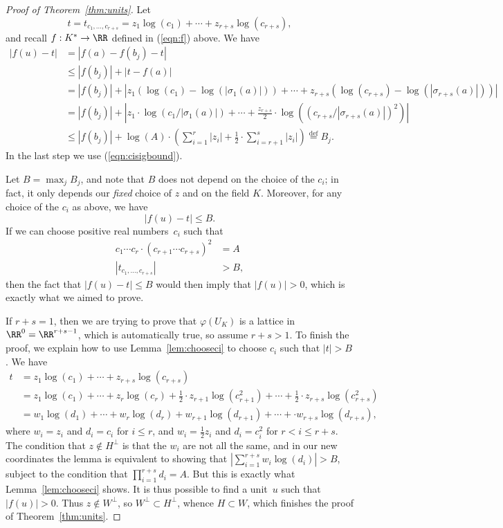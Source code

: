 \begin{proof}[Proof of Theorem~\ref{thm:units}]
  Let
  \[
    t = t_{c_1,\dots, c_{r+s}} = z_1\log(c_1)+\cdots +z_{r+s}\log(c_{r+s}),
  \]
  and recall $f:K^* \to \RR$ defined in (\ref{eqn:f}) above. We have
  \begin{align*}
    |f(u) - t| &= |f(a) - f(b_j) - t| \\
    &\leq |f(b_j)| + |t - f(a)| \\
    &=|f(b_j)| + \left|z_1(\log(c_1) - \log(|\sigma_1(a)|)) + \cdots + z_{r+s}(\log(c_{r+s}) - \log(|\sigma_{r+s}(a)|))\right|
    \\
    &=|f(b_j)| + \left|z_1\cdot \log(c_1/|\sigma_1(a)|) + \cdots + \frac{z_{r+s}}{2}\cdot \log((c_{r+s}/|\sigma_{r+s}(a)|)^2)\right|
    \\
    &\leq |f(b_j)| + \log(A)\cdot\left(\sum_{i=1}^{r}|z_i| + \frac{1}{2}\cdot \sum_{i=r+1}^s|z_i|\right)
    \overset{\text{def}}{=} B_j.
  \end{align*}
  In the last step we use (\ref{eqn:cisigbound}).
  
  Let $B=\max_{j} B_j$, and note that $B$ does not depend on the choice
  of the $c_i$; in fact, it only depends our {\em fixed} choice of $z$ and
  on the field $K$. Moreover, for any choice of the $c_i$ as above, we have
  \[
    |f(u) - t| \leq B.
  \]
  If we can choose positive real numbers~$c_i$ such that
  \begin{align*}
    c_1\cdots c_r\cdot (c_{r+1}\cdots c_{r+s})^2 &= A
    \\
    |t_{c_1,\dots, c_{r+s}}| &>B,
  \end{align*}
  then the fact that $|f(u)-t|\leq B$ would then imply that $|f(u)|>0$,
  which is exactly what we aimed to prove.
  
  If $r+s=1$, then we are trying to prove that $\varphi(U_K)$ is a lattice
  in $\RR^0 = \RR^{r+s-1}$, which is automatically true, so assume $r+s > 1$.
  To finish the proof, we explain how to use Lemma~\ref{lem:chooseci}
  to choose $c_i$ such that $|t|>B$. We have
  \begin{align*}
    t
    &= z_1\log(c_1)+\cdots + z_{r+s}\log(c_{r+s}) \\
    &= z_1\log(c_1)+\cdots + z_r\log(c_r)
    + \frac{1}{2}\cdot z_{r+1}\log(c_{r+1}^2) + \cdots
    + \frac{1}{2}\cdot z_{r+s}\log(c_{r+s}^2) \\
    &= w_1\log(d_1)+\cdots + w_r\log(d_r)+ w_{r+1}\log(d_{r+1}) +
    \cdots +\cdot w_{r+s}\log(d_{r+s}),
  \end{align*}
  where $w_i=z_i$ and $d_i=c_i$ for $i\leq r$, and
  $w_i=\frac{1}{2}z_i$ and $d_i=c_i^2$ for $r<i\leq r+s$.
  The condition that $z\not\in H^{\perp}$ is that the $w_i$ are not all
  the same, and in our new coordinates the lemma is equivalent to
  showing that $|\sum_{i=1}^{r+s} w_i \log(d_i)|>B$, subject to the
  condition that $\prod_{i=1}^{r+s} d_i = A$.
  But this is exactly what Lemma~\ref{lem:chooseci} shows. It is thus possible
  to find a unit~$u$ such that $|f(u)|>0$. Thus $z\not\in W^{\perp}$,
  so $W^{\perp}\subset H^{\perp}$, whence $H\subset W$,
  which finishes the proof of Theorem~\ref{thm:units}.
\end{proof}

